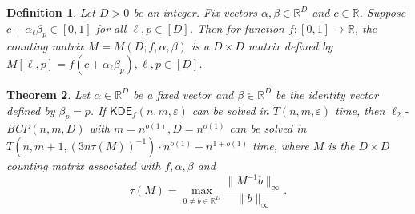 \documentclass[10pt,a4paper]{article}
\newtheorem{theorem}{Theorem}
\newtheorem{definition}[theorem]{Definition}
\theoremstyle{remark}
\numberwithin{equation}{section}
\numberwithin{theorem}{section}
\newcommand{\R}{\ensuremath{\mathbb{R}}}
\newcommand{\eps}{\varepsilon}
\newcommand{\KDE}{\mathsf{KDE}}
\begin{document}
\begin{definition}
\label{def:countingmatrix}
Let $D > 0$ be an integer. Fix vectors $\alpha, \beta \in \R^D$ and $c \in \R$. Suppose $c + \alpha_{\ell}\beta_{p} \in [0, 1]$ for all $\ell, p \in [D]$. Then for function $f: [0, 1] \rightarrow \R$, the counting matrix $M = M(D;f, \alpha, \beta)$ is a $D \times D$ matrix defined by $M[\ell, p] = f(c + \alpha_{\ell}\beta_p), \ell, p \in [D]$.
\end{definition}
\begin{theorem}
Let $\alpha \in \R^D$ be a fixed vector and $\beta \in \R^D$ be the identity vector defined by $\beta_p = p$. If $\KDE_f(n,m,\eps)$ can be solved in $T(n, m, \eps)$ time, then $\ell_2$\emph{\textsf{-BCP}}$(n, m, D)$ with $m = n^{o(1)}, D = n^{o(1)}$ can be solved in $T(n, m+1, (3n\tau(M))^{-1}) \cdot n^{o(1)} + n^{1 + o(1)}$ time, where $M$ is the $D \times D$ counting matrix associated with $f, \alpha, \beta$ and
\[\tau(M) = \max_{0 \ne b \in \R^{D}} \frac{\|M^{-1}b\|_{\infty}}{\|b\|_{\infty}}.\]
\end{theorem}
\end{document}
